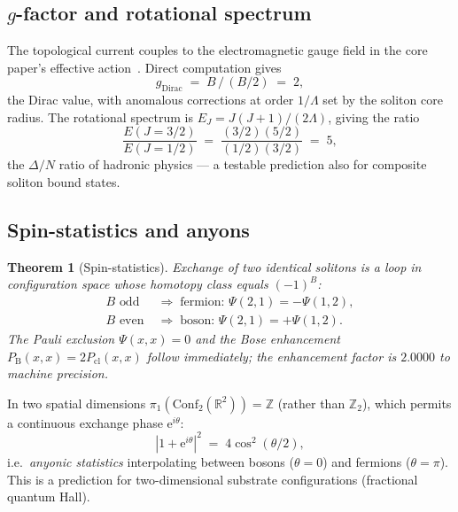 \documentclass[11pt,a4paper]{article}
\newcommand{\Nwind}{B}
\newcommand{\pioneS}{\pi_{1}}
\newtheorem{theorem}{Theorem}
\begin{document}
\subsection{$g$-factor and rotational spectrum}

The topological current couples to the electromagnetic gauge field in
the core paper's effective action~\cite{TGP-core}. Direct
computation gives
\begin{equation}\label{eq:g-factor}
  g_{\mathrm{Dirac}} \;=\; \Nwind\,/\,(\Nwind/2) \;=\; 2,
\end{equation}
the Dirac value, with anomalous corrections at order $1/\Lambda$ set
by the soliton core radius. The rotational spectrum is
$E_{J}=J(J+1)/(2\Lambda)$, giving the ratio
\begin{equation}\label{eq:delta-N}
  \frac{E(J{=}3/2)}{E(J{=}1/2)} \;=\; \frac{(3/2)(5/2)}{(1/2)(3/2)}\;=\;5,
\end{equation}
the $\Delta/N$ ratio of hadronic physics --- a testable prediction
also for composite soliton bound states.

\subsection{Spin-statistics and anyons}

\begin{theorem}[Spin-statistics]\label{thm:spinstat}
Exchange of two identical solitons is a loop in configuration space
whose homotopy class equals $(-1)^{\Nwind}$:
\begin{align}
  \Nwind \text{ odd}   &\;\Longrightarrow\; \text{fermion: } \Psi(2,1)=-\Psi(1,2), \\
  \Nwind \text{ even}  &\;\Longrightarrow\; \text{boson: } \Psi(2,1)=+\Psi(1,2).
\end{align}
The Pauli exclusion $\Psi(x,x)=0$ and the Bose enhancement
$P_{\mathrm{B}}(x,x)=2P_{\mathrm{cl}}(x,x)$ follow immediately; the
enhancement factor is $2.0000$ to machine precision.
\end{theorem}

In two spatial dimensions $\pioneS(\mathrm{Conf}_{2}(\mathbb{R}^{2}))=\mathbb{Z}$
(rather than $\mathbb{Z}_{2}$), which permits a continuous exchange
phase $\mathrm{e}^{i\theta}$:
\begin{equation}
  |1+\mathrm{e}^{i\theta}|^{2} \;=\; 4\cos^{2}(\theta/2),
\end{equation}
i.e.\ \emph{anyonic statistics} interpolating between bosons
($\theta=0$) and fermions ($\theta=\pi$). This is a prediction for
two-dimensional substrate configurations (fractional quantum Hall).
\end{document}
